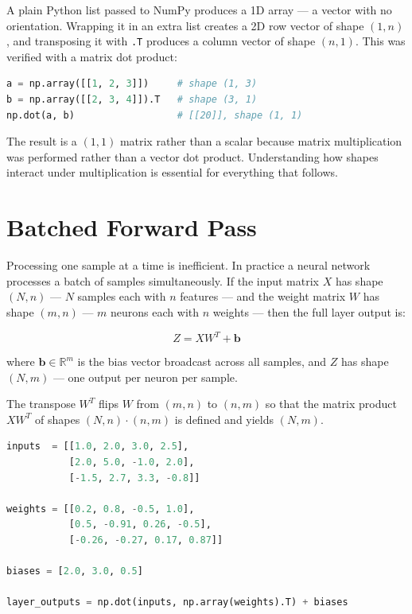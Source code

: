 \documentclass[12pt,a4paper]{report}
\begin{document}
A plain Python list passed to NumPy produces a 1D array — a vector with no orientation.
Wrapping it in an extra list creates a 2D row vector of shape $(1, n)$, and transposing
it with \texttt{.T} produces a column vector of shape $(n, 1)$. This was verified
with a matrix dot product:

\begin{lstlisting}[language=Python]
a = np.array([[1, 2, 3]])     # shape (1, 3)
b = np.array([[2, 3, 4]]).T   # shape (3, 1)
np.dot(a, b)                  # [[20]], shape (1, 1)
\end{lstlisting}

The result is a $(1, 1)$ matrix rather than a scalar because matrix multiplication
was performed rather than a vector dot product. Understanding how shapes interact
under multiplication is essential for everything that follows.

\section{Batched Forward Pass}

Processing one sample at a time is inefficient. In practice a neural network processes
a batch of samples simultaneously. If the input matrix $X$ has shape
$(N, n)$ — $N$ samples each with $n$ features — and the weight matrix $W$ has shape
$(m, n)$ — $m$ neurons each with $n$ weights — then the full layer output is:

\begin{equation}
    Z = X W^T + \mathbf{b}
\end{equation}

where $\mathbf{b} \in \mathbb{R}^m$ is the bias vector broadcast across all samples,
and $Z$ has shape $(N, m)$ — one output per neuron per sample.

The transpose $W^T$ flips $W$ from $(m, n)$ to $(n, m)$ so that the matrix product
$X W^T$ of shapes $(N, n) \cdot (n, m)$ is defined and yields $(N, m)$.

\begin{lstlisting}[language=Python]
inputs  = [[1.0, 2.0, 3.0, 2.5],
           [2.0, 5.0, -1.0, 2.0],
           [-1.5, 2.7, 3.3, -0.8]]

weights = [[0.2, 0.8, -0.5, 1.0],
           [0.5, -0.91, 0.26, -0.5],
           [-0.26, -0.27, 0.17, 0.87]]

biases = [2.0, 3.0, 0.5]

layer_outputs = np.dot(inputs, np.array(weights).T) + biases
\end{lstlisting}
\end{document}
